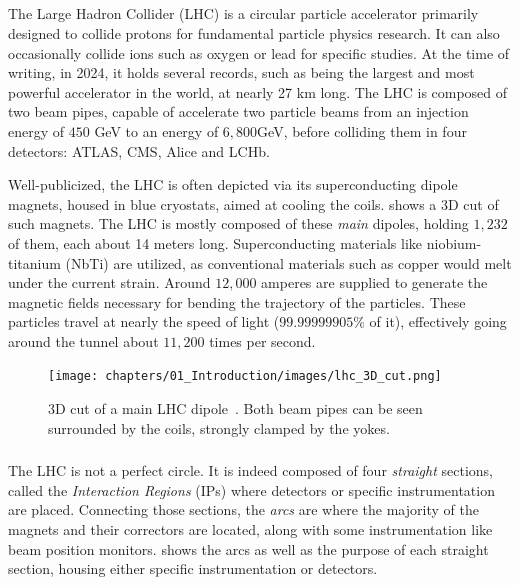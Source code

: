 \subsection{}

The Large Hadron Collider (LHC) is a circular particle accelerator primarily designed to collide
protons for fundamental particle physics research. It can also occasionally collide ions such as
oxygen or lead for specific studies. At the time of writing, in 2024, it holds several records,
such as being the largest and most powerful accelerator in the world, at nearly 27 km long. The LHC
is composed of two beam pipes, capable of accelerate two particle beams from an injection energy
of $450$ GeV to an energy of $6,800$GeV, before colliding them in four detectors: ATLAS, CMS, Alice
and LCHb.

Well-publicized, the LHC is often depicted via its superconducting dipole magnets, housed in blue
cryostats, aimed at cooling the coils.  shows a 3D cut of such magnets. The
LHC is mostly composed of these \textit{main} dipoles, holding $1,232$ of them, each about 14 meters
long. Superconducting materials like niobium-titanium (NbTi) are utilized, as conventional materials
such as copper would melt under the current strain. Around $12,000$ amperes are supplied to generate
the magnetic fields necessary for bending the trajectory of the particles. These particles travel
at nearly the speed of light ($99.99999905\%$ of it), effectively going around the tunnel about
$11,200$ times per second.

\begin{figure}[!htb]
    \centering
    \texttt{[image: chapters/01\_Introduction/images/lhc\_3D\_cut.png]}
    \caption{3D cut of a main LHC dipole~\cite{noauthor_cern_nodate}. Both beam pipes can be seen
    surrounded by the coils, strongly clamped by the yokes.}
    \label{fig:3d_cut_dipole}
\end{figure}


\subsubsection{}

The LHC is not a perfect circle. It is indeed composed of four \textit{straight} sections, called
the \textit{Interaction Regions} (IPs) where detectors or specific instrumentation are placed.
Connecting those sections, the \textit{arcs} are where the majority of the magnets and their
correctors are located, along with some instrumentation like beam position monitors.
 shows the arcs as well as the purpose of each straight section,
housing either specific instrumentation or detectors.

